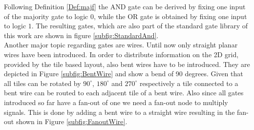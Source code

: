Following Definition \ref{Def:majf} the AND gate can be derived by fixing one input of the majority gate to logic $0$, while the OR gate is obtained by fixing one input to logic $1$. The resulting gates, which are also part of the standard gate library of this work are shown in figure \ref{subfig:StandardAnd}.\\

Another major topic regarding gates are wires. Until now only straight planar wires have been introduced. In order to distribute information on the 2D grid, provided by the tile based layout, also bent wires have to be introduced. They are depicted in Figure \ref{subfig:BentWire} and show a bend of 90 degrees. Given that all tiles can be rotated by $90^{\circ}$, $180^{\circ}$ and $270^{\circ}$ respectively a tile connected to a bent wire can be routed to each adjacent tile of a bent wire. Also since all gates introduced so far have a fan-out of one we need a fan-out node to multiply signals. This is done by adding a bent wire to a straight wire resulting in the fan-out shown in Figure \ref{subfig:FanoutWire}.\\
